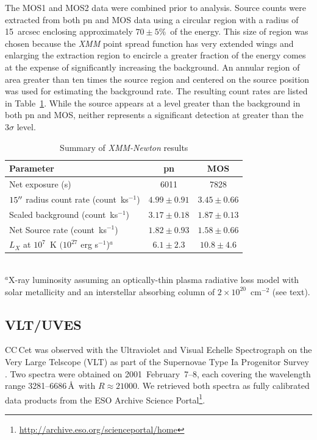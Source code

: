 \documentclass[fleqn,usenatbib]{mnras}
\begin{document}
The MOS1 and MOS2 data were combined prior to analysis. Source counts were extracted from both pn and MOS data using a circular region with a radius of 15~arcsec enclosing approximately $70\pm 5$\%\ of the energy.  This size of region was chosen because the \textit{XMM} point spread function has very extended wings and enlarging the extraction region to encircle a greater fraction of the energy comes at the expense of significantly increasing the background.  An annular region of area greater than ten times the source region and centered on the source position was used for estimating the background rate.  The resulting count rates are listed in Table~\ref{t:xmm}. While the source appears at a level greater than the background in both pn and MOS, neither represents a significant detection at greater than the $3\sigma$ level.   

\begin{table} 
\setlength{\tabcolsep}{4pt} %
\caption{Summary of {\it XMM-Newton} results}
\begin{tabular}{lcc}
\hline
Parameter & pn & MOS\\
\hline 
Net exposure (s) & 6011 & 7828 \\
$15\hbox{$^{\prime\prime}$}$ radius count rate  (count~ks$^{-1}$) & $4.99\pm 0.91$ & $3.45\pm 0.66$ \\
Scaled background (count~ks$^{-1}$) & $3.17\pm 0.18$ &  $1.87\pm 0.13$\\
Net Source rate (count~ks$^{-1}$) & $1.82\pm 0.93$ & $1.58\pm 0.66$ \\
$L_X$ at $10^7$~K $(10^{27}$ erg s$^{-1}$)$^a$ & $6.1\pm 2.3$& $10.8\pm 4.6$\\
\hline
\end{tabular} 
\label{t:xmm} \\
{\footnotesize $^a$X-ray luminosity assuming an optically-thin plasma radiative loss model with solar metallicity and an interstellar absorbing column of $2\times 10^{20}$~cm$^{-2}$ (see text).}
\end{table} 

\subsection{VLT/UVES}
CC\,Cet was observed with the Ultraviolet and Visual Echelle Spectrograph \citep[UVES,][]{Dekkeretal00-1} on the Very Large Telscope (VLT) as part of the Supernovae Type Ia Progenitor Survey  \citep[SPY,][]{napiwotzkietal20-1, koesteretal09-2}. Two spectra were obtained on 2001~February~7--8, each covering the wavelength range 3281--6686\,\AA\ with $R\approx21000$. We retrieved both spectra as fully calibrated data products from the ESO Archive Science Portal\footnote{\url{http://archive.eso.org/scienceportal/home}}.
\end{document}
